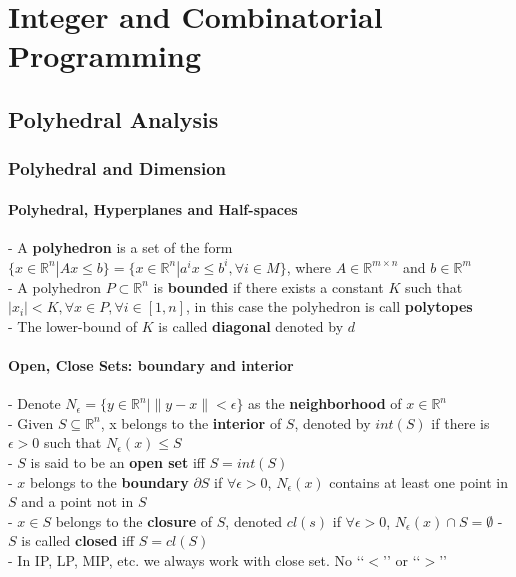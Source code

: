 \part{Integer and Combinatorial Programming}
	\chapter{Polyhedral Analysis}
		\section{Polyhedral and Dimension}
			\subsection{Polyhedral, Hyperplanes and Half-spaces}
				- A \textbf{polyhedron} is a set of the form $\{x\in \mathbb{R}^n|Ax\le b\}=\{x \in \mathbb{R}^n | a^ix\le b^i, \forall i \in M\}$, where $A \in \mathbb{R}^{m\times n}$ and $b \in \mathbb{R}^m$\\
				- A polyhedron $P \subset \mathbb{R}^n$ is \textbf{bounded} if there exists a constant $K$ such that $|x_i|<K, \forall x \in P, \forall i \in [1, n]$, in this case the polyhedron is call \textbf{polytopes}\\
				- The lower-bound of $K$ is called \textbf{diagonal} denoted by $d$\\

			\subsection{Open, Close Sets: boundary and interior}
				- Denote $N_\epsilon = \{y\in \mathbb{R}^n|\lVert y-x\rVert < \epsilon \}$ as the \textbf{neighborhood} of $x\in \mathbb{R}^n$\\
				- Given $S\subseteq \mathbb{R}^n$, x belongs to the \textbf{interior} of $S$, denoted by $int(S)$ if there is $\epsilon > 0$ such that $N_\epsilon(x) \le S$\\
				- $S$ is said to be an \textbf{open set} iff $S=int(S)$\\
				- $x$ belongs to the \textbf{boundary} $\partial S$ if $\forall \epsilon >0$, $N_\epsilon(x)$ contains at least one point in $S$ and a point not in $S$\\
				- $x\in S$ belongs to the \textbf{closure} of $S$, denoted $cl(s)$ if $\forall \epsilon > 0$, $N_\epsilon(x) \cap S = \emptyset$
				- $S$ is called \textbf{closed} iff $S=cl(S)$\\
				- In IP, LP, MIP, etc. we always work with close set. No \lq\lq{}$<$\rq\rq{} or \lq\lq{}$>$\rq\rq{}

